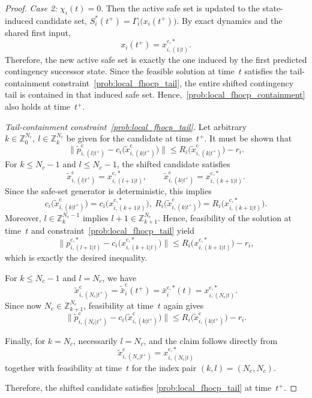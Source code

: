 \documentclass[twocolumn]{autart}
\begin{document}
\begin{proof}
\emph{Case 2:} $\chi_i(t)=0$.
Then the active safe set is updated to the state-induced candidate set,
\(
S_i^\ast(t^+) = \Gamma_i\!\bigl(x_i(t^+)\bigr).
\)
By exact dynamics and the shared first input,
\[
x_i(t^+) = x_{i,(1|t)}^{c,\ast}.
\]
Therefore, the new active safe set is exactly the one induced by the first predicted contingency successor state.
Since the feasible solution at time~$t$ satisfies the tail-containment constraint~\eqref{prob:local_fhocp_tail}, the entire shifted contingency tail is contained in that induced safe set.
Hence,~\eqref{prob:local_fhocp_containment} also holds at time~$t^+$.

\emph{Tail-containment constraint~\eqref{prob:local_fhocp_tail}.}
Let arbitrary
\(
k\in\mathbb{Z}_{0}^{N_c}, \ l\in\mathbb{Z}_{k}^{N_c}
\)
be given for the candidate at time~$t^+$.
It must be shown that
\[
\bigl\|\tilde p^{\mathrm c}_{i,(l|t^+)}
-
c_i\!\bigl(\tilde x^{\mathrm c}_{i,(k|t^+)}\bigr)\bigr\|
\le
R_i\!\bigl(\tilde x^{\mathrm c}_{i,(k|t^+)}\bigr)-r_i.
\]
For $k\le N_c-1$ and $l\le N_c-1$, the shifted candidate satisfies
\[
\tilde x^{\mathrm c}_{i,(l|t^+)} = x^{\mathrm c,\ast}_{i,(l+1|t)},
\qquad
\tilde x^{\mathrm c}_{i,(k|t^+)} = x^{\mathrm c,\ast}_{i,(k+1|t)}.
\]
Since the safe-set generator is deterministic, this implies
\[
c_i\!\bigl(\tilde x^{\mathrm c}_{i,(k|t^+)}\bigr)
=
c_i\!\bigl(x^{\mathrm c,\ast}_{i,(k+1|t)}\bigr),
\ 
R_i\!\bigl(\tilde x^{\mathrm c}_{i,(k|t^+)}\bigr)
=
R_i\!\bigl(x^{\mathrm c,\ast}_{i,(k+1|t)}\bigr).
\]
Moreover, $l\in\mathbb{Z}_{k}^{N_c-1}$ implies $l+1\in\mathbb{Z}_{k+1}^{N_c}$.
Hence, feasibility of the solution at time~$t$ and constraint~\eqref{prob:local_fhocp_tail} yield
\[
\bigl\|p^{\mathrm c,\ast}_{i,(l+1|t)}
-
c_i\!\bigl(x^{\mathrm c,\ast}_{i,(k+1|t)}\bigr)\bigr\|
\le
R_i\!\bigl(x^{\mathrm c,\ast}_{i,(k+1|t)}\bigr)-r_i,
\]
which is exactly the desired inequality.

For $k\le N_c-1$ and $l=N_c$, we have
\[
\tilde x^{\mathrm c}_{i,(N_c|t^+)}
=
\tilde{\bar x}^{\mathrm c}_i(t^+)
=
\bar x^{\mathrm c,\ast}_i(t)
=
x^{\mathrm c,\ast}_{i,(N_c|t)}.
\]
Since now $N_c\in\mathbb{Z}_{k+1}^{N_c}$, feasibility at time~$t$ again gives
\[
\bigl\|\tilde p^{\mathrm c}_{i,(N_c|t^+)}
-
c_i\!\bigl(\tilde x^{\mathrm c}_{i,(k|t^+)}\bigr)\bigr\|
\le
R_i\!\bigl(\tilde x^{\mathrm c}_{i,(k|t^+)}\bigr)-r_i.
\]

Finally, for $k=N_c$, necessarily $l=N_c$, and the claim follows directly from
\[
\tilde x^{\mathrm c}_{i,(N_c|t^+)} = x^{\mathrm c,\ast}_{i,(N_c|t)}
\]
together with feasibility at time~$t$ for the index pair $(k,l)=(N_c,N_c)$.

Therefore, the shifted candidate satisfies
\eqref{prob:local_fhocp_tail} at time~$t^+$.
\end{proof}
\end{document}
